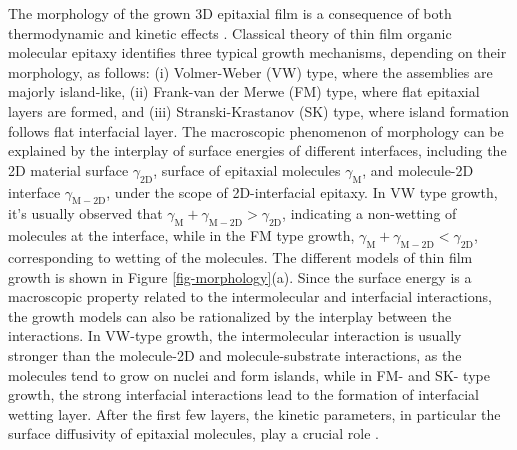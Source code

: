 The morphology of the grown 3D epitaxial film is a consequence of both
thermodynamic and kinetic effects \cite{Kowarik_2008_rev_MBE}. Classical
theory of thin film organic molecular epitaxy identifies three typical
growth mechanisms, depending on their morphology, as follows: (i)
Volmer-Weber (VW) type, where the assemblies are majorly island-like,
(ii) Frank-van der Merwe (FM) type, where flat epitaxial layers are
formed, and (iii) Stranski-Krastanov (SK) type, where island formation
follows flat interfacial layer. The macroscopic phenomenon of
morphology can be explained by the interplay of surface energies of
different interfaces, including the 2D material surface
\(\gamma_{\mathrm{2D}}\), surface of epitaxial molecules
\(\gamma_{\mathrm{M}}\), and molecule-2D interface
\(\gamma_{\mathrm{M-2D}}\), under the scope of 2D-interfacial
epitaxy. In VW type growth, it's usually observed that
\(\gamma_{\mathrm{M}} + \gamma_{\mathrm{M-2D}} > \gamma_{\mathrm{2D}}\),
indicating a non-wetting of molecules at the interface, while in the
FM type growth, \(\gamma_{\mathrm{M}} + \gamma_{\mathrm{M-2D}} <
\gamma_{\mathrm{2D}}\), corresponding to wetting of the molecules. The
different models of thin film growth is shown in Figure
\ref{fig-morphology}(a). Since the surface energy is a macroscopic
property related to the intermolecular and interfacial interactions,
the growth models can also be rationalized by the interplay between
the interactions. In VW-type growth, the intermolecular interaction is
usually stronger than the molecule-2D and molecule-substrate
interactions, as the molecules tend to grow on nuclei and form
islands, while in FM- and SK- type growth, the strong interfacial
interactions lead to the formation of interfacial wetting layer. After
the first few layers, the kinetic parameters, in particular the
surface diffusivity of epitaxial molecules, play a crucial role
\cite{Chatraphorn_2001_limit_diff}.

